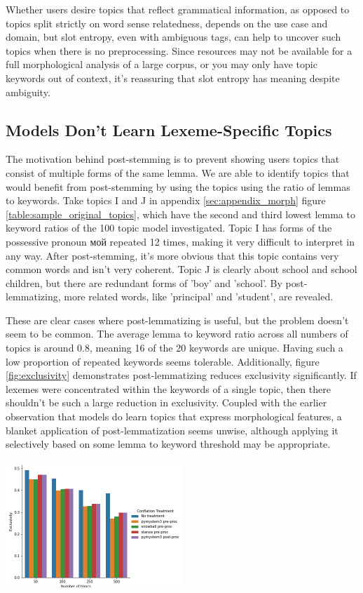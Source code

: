\documentclass[11pt,a4paper]{article}
\begin{document}
Whether users desire topics that reflect grammatical information, as opposed to topics split strictly on word sense relatedness, depends on the use case and domain, but slot entropy, even with ambiguous tags, can help to uncover such topics when there is no preprocessing. Since resources may not be available for a full morphological analysis of a large corpus, or you may only have topic keywords out of context, it's reassuring that slot entropy has meaning despite ambiguity.

\subsection{Models Don't Learn Lexeme-Specific Topics}
The motivation behind post-stemming is to prevent showing users topics that consist of multiple forms of the same lemma. We are able to identify topics that would benefit from post-stemming by using the topics using the ratio of lemmas to keywords. Take topics I and J in appendix \ref{sec:appendix_morph} figure \ref{table:sample_original_topics}, which have the second and third lowest lemma to keyword ratios of the 100 topic model investigated. Topic I has forms of the possessive pronoun \foreignlanguage{russian}{мой} repeated 12 times, making it very difficult to interpret in any way. After post-stemming, it's more obvious that this topic contains very common words and isn't very coherent. Topic J is clearly about school and school children, but there are redundant forms of 'boy' and 'school'. By post-lemmatizing, more related words, like 'principal' and 'student', are revealed.

These are clear cases where post-lemmatizing is useful, but the problem doesn't seem to be common. The average lemma to keyword ratio across all numbers of topics is around 0.8, meaning 16 of the 20 keywords are unique. Having such a low proportion of repeated keywords seems tolerable. Additionally, figure \ref{fig:exclusivity} demonstrates post-lemmatizing reduces exclusivity significantly. If lexemes were concentrated within the keywords of a single topic, then there shouldn't be such a large reduction in exclusivity. Coupled with the earlier observation that models do learn topics that express morphological features, a blanket application of post-lemmatization seems unwise, although applying it selectively based on some lemma to keyword threshold may be appropriate.

\begin{center}
\includegraphics[width=0.5\textwidth]{exclusivity.png}
\label{fig:exclusivity}
\end{center}
\end{document}
